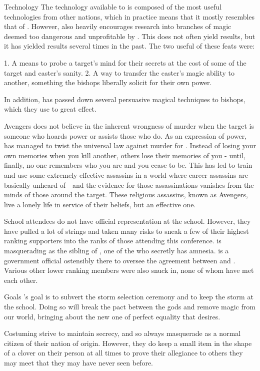 \documentclass[blue]{GL2020}
\begin{document}
Technology
The technology available to \cCult is composed of the most useful technologies from other nations, which in practice means that it mostly resembles that of \pTech. However, \pCult also heavily encourages research into branches of magic deemed too dangerous and unprofitable by \pTech. This does not often yield results, but it has yielded results several times in the past. The two useful of these feats were: 

1. A means to probe a target's mind for their secrets at the cost of some of the target and caster's sanity. 
2. A way to transfer the caster's magic ability to another, something the bishops liberally solicit for their own power.

In addition, \cCultLeader has passed down several persuasive magical techniques to bishops, which they use to great effect.

Avengers
\pCult does not believe in the inherent wrongness of murder when the target is someone who hoards power or assists those who do. As an expression of power, \cCultGod has managed to twist the universal law against murder for \pCult. Instead of losing your own memories when you kill another, others lose their memories of you - until, finally, no one remembers who you are and you cease to be. This has led \pCult to train and use some extremely effective assassins in a world where career assassins are basically unheard of - and the evidence for those assassinations vanishes from the minds of those around the target. These religious assassins, known as Avengers, live a lonely life in service of their beliefs, but an effective one.

School attendees
\pCult do not have official representation at the school. However, they have pulled a lot of strings and taken many risks to sneak a few of their highest ranking supporters into the ranks of those attending this conference. \cCultLeader is masquerading as the sibling of \cAmnesiac, one of the \pViking who secretly has amnesia. \cTechBishop is a government official ostensibly there to oversee the agreement between \pTech and \pFarm. Various other lower ranking members were also snuck in, none of whom have met each other.

Goals
\pCult's goal is to subvert the storm selection ceremony and to keep the storm at the school. Doing so will break the pact between the gods and remove magic from our world, bringing about the new one of perfect equality that \pCult desires.

Costuming
\pCult strive to maintain secrecy, and so always masquerade as a normal citizen of their nation of origin. However, they do keep a small item in the shape of a clover on their person at all times to prove their allegiance to others they may meet that they may have never seen before.
\end{document}

